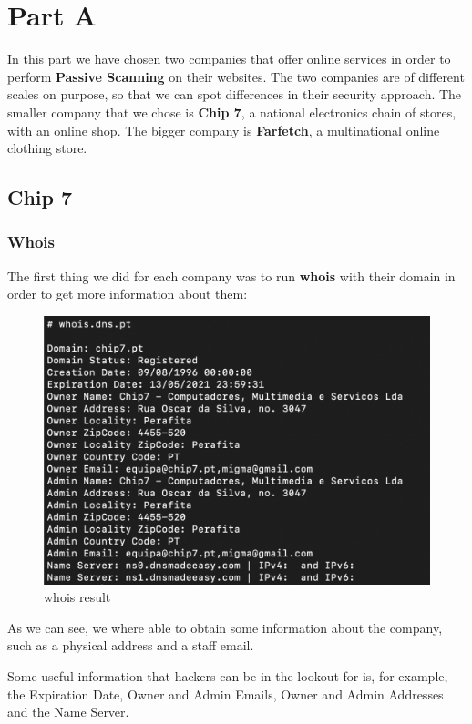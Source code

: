 \section{Part A}

In this part we have chosen two companies that offer online services in order to perform \textbf{Passive Scanning} on their websites. The two companies are of different scales on purpose, so that we can spot differences in their security approach. The smaller company that we chose is \textbf{Chip 7}, a national electronics chain of stores, with an online shop. The bigger company is \textbf{Farfetch}, a multinational online clothing store.

\subsection{Chip 7}

\subsubsection{Whois}

The first thing we did for each company was to run \textbf{whois} with their domain in order to get more information about them:

\begin{figure}[ht!]
 	\centering
 	\includegraphics[width=0.9\linewidth]{img/whois1.png}
 	\caption{whois result}
\end{figure}
 
As we can see, we where able to obtain some information about the company, such as a physical address and a staff email.

Some useful information that hackers can be in the lookout for is, for example, the Expiration Date, Owner and Admin Emails, Owner and Admin Addresses and the Name Server. 

